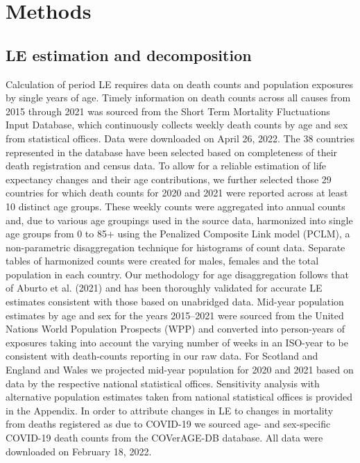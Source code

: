 \documentclass[12pt]{article}
\begin{document}
\section*{Methods}

\subsection*{LE estimation and decomposition}

Calculation of period LE requires data on death counts and population exposures by single years of age. Timely information on death counts across all causes from 2015 through 2021 was sourced from the Short Term Mortality Fluctuations Input Database,\citealp{Jdanov2021, Nemeth2021} which continuously collects weekly death counts by age and sex from statistical offices. Data were downloaded on April 26, 2022. The 38 countries represented in the database have been selected based on completeness of their death registration and census data. To allow for a reliable estimation of life expectancy changes and their age contributions, we further selected those 29 countries for which death counts for 2020 and 2021 were reported across at least 10 distinct age groups. These weekly counts were aggregated into annual counts and, due to various age groupings used in the source data, harmonized into single age groups from 0 to 85+ using the Penalized Composite Link model (PCLM),\citealp{Rizzi2015, Pascariu2018} a non-parametric disaggregation technique for histograms of count data. Separate tables of harmonized counts were created for males, females and the total population in each country. Our methodology for age disaggregation follows that of Aburto et al. (2021)\citealp{Aburto2021b} and has been thoroughly validated for accurate LE estimates consistent with those based on unabridged data. Mid-year population estimates by age and sex for the years 2015--2021 were sourced from the United Nations World Population Prospects (WPP)\citealp{UnitedNations2021} and converted into person-years of exposures taking into account the varying number of weeks in an ISO-year \citealp{IOS2021} to be consistent with death-counts reporting in our raw data. For Scotland and England and Wales we projected mid-year population for 2020 and 2021 based on data by the respective national statistical offices. Sensitivity analysis with alternative population estimates taken from national statistical offices is provided in the Appendix. In order to attribute changes in LE to changes in mortality from deaths registered as due to COVID-19 we sourced age- and sex-specific COVID-19 death counts from the COVerAGE-DB database.\citealp{Riffe2021} All data were downloaded on February 18, 2022.
\end{document}
